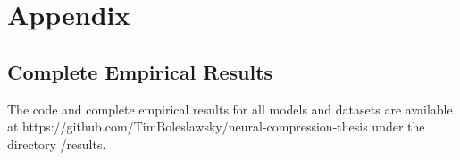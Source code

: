 \chapter{Appendix}

\section*{Complete Empirical Results}
\label{app:empirical-results}

The code and complete empirical results for all models and datasets are available at https://github.com/TimBoleslawsky/neural-compression-thesis under the directory /results.